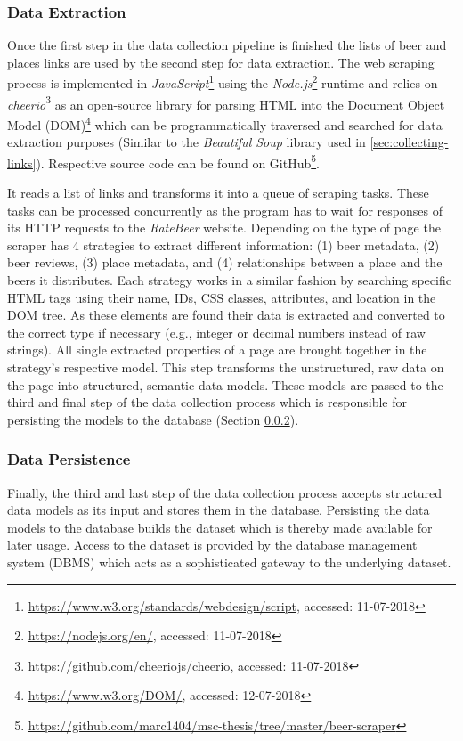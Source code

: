 \subsubsection{Data Extraction} \label{sec:data-extraction}
Once the first step in the data collection pipeline is finished the lists of beer and places links are used by the second step for data extraction.
The web scraping process is implemented in \textit{JavaScript}\footnote{\url{https://www.w3.org/standards/webdesign/script}, accessed: 11-07-2018} using the \textit{Node.js}\footnote{\url{https://nodejs.org/en/}, accessed: 11-07-2018} \cite{Tilkov2010} runtime and relies on \textit{cheerio}\footnote{\url{https://github.com/cheeriojs/cheerio}, accessed: 11-07-2018} as an open-source library for parsing HTML into the Document Object Model (DOM)\footnote{\url{https://www.w3.org/DOM/}, accessed: 12-07-2018} which can be programmatically traversed and searched for data extraction purposes (Similar to the \textit{Beautiful Soup} library used in \ref{sec:collecting-links}).
Respective source code can be found on GitHub\footnote{\url{https://github.com/marc1404/msc-thesis/tree/master/beer-scraper}}.

It reads a list of links and transforms it into a queue of scraping tasks.
These tasks can be processed concurrently as the program has to wait for responses of its HTTP requests to the \textit{RateBeer} website.
Depending on the type of page the scraper has 4 strategies to extract different information: (1) beer metadata, (2) beer reviews, (3) place metadata, and (4) relationships between a place and the beers it distributes.
Each strategy works in a similar fashion by searching specific HTML tags using their name, IDs, CSS classes, attributes, and location in the DOM tree.
As these elements are found their data is extracted and converted to the correct type if necessary (e.g., integer or decimal numbers instead of raw strings).
All single extracted properties of a page are brought together in the strategy's respective model.
This step transforms the unstructured, raw data on the page into structured, semantic data models.
These models are passed to the third and final step of the data collection process which is responsible for persisting the models to the database (Section \ref{sec:data-persistence}).


\subsubsection{Data Persistence} \label{sec:data-persistence}
Finally, the third and last step of the data collection process accepts structured data models as its input and stores them in the database.
Persisting the data models to the database builds the dataset which is thereby made available for later usage.
Access to the dataset is provided by the database management system (DBMS)\cite{Christensson2006} which acts as a sophisticated gateway to the underlying dataset.

